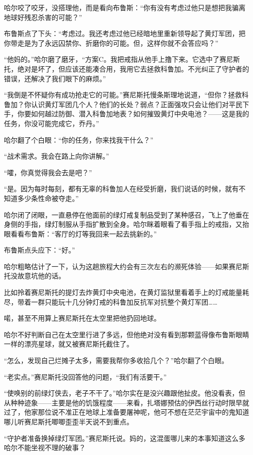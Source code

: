 \documentclass[../main]{subfiles}
\begin{document}
哈尔咬了咬牙，没搭理他，而是看向布鲁斯：“你有没有考虑过他只是想把我骗离地球好残忍杀害的可能？”

布鲁斯点了下头：“考虑过。我还考虑过他已经暗地里重新领导起了黄灯军团，把你带走是为了永远囚禁你、折磨你的可能。但，这样你就不会答应吗？”

“他妈的。”哈尔磨了磨牙，“方案C。我把戒指从他手上撸下来。它选中了赛尼斯托，绝对是坏了，但应该还能凑合用，我用它去拯救科鲁加。不光纠正了守护者的错误，还解决了我们眼下的麻烦。”

“我倒是不怀疑你有成功抢走它的可能。”赛尼斯托慢条斯理地说道，“但你？拯救科鲁加？你认识黄灯军团几个人？他们的长处？弱点？正面强攻只会让他们对平民下手，你要如何越过防御、潜入科鲁加地表？如何摧毁黄灯中央电池？——这是我的任务，你没可能完成它，乔丹。”

哈尔翻了个白眼：“你的任务，你来找我干什么？”

“战术需求。我会在路上向你讲解。”

“嚯，你真觉得我会去是吧？”

“是。因为每时每刻，都有无辜的科鲁加人在经受折磨，我们说话的时候，就有不知道多少条性命被夺走。”

哈尔闭了闭眼，一直悬停在他面前的绿灯戒复制品受到了某种感召，飞上了他垂在身侧的手指，绿灯制服从手指扩散到全身。哈尔眯着眼看了看手指上的戒指，又抬眼看看布鲁斯：“客厅的灯等我回来一起去挑新的。”

布鲁斯点头应下：“好。”

哈尔粗略估计了一下，认为这趟旅程大约会有三次左右的濒死体验——如果赛尼斯托没故意坑他的话。

比如拎着赛尼斯托的提灯去炸黄灯中央电池，在黄灯监狱里看着手上的灯戒能量耗尽，带着一群只能玩十几分钟灯戒的科鲁加反抗军对抗整个黄灯军团……

喏，甚至不用算上赛尼斯托在太空里把他扔回地球。

哈尔不好判断自己在太空里行进了多远，但他绝对没有看到那颗蓝得像布鲁斯眼睛一样的漂亮星球，就又被赛尼斯托截住了。

“怎么，发现自己烂摊子太多，需要我帮你多收拾几个？”哈尔翻了个白眼。

“老实点。”赛尼斯托没回答他的问题，“我们有活要干。”

“使唤别的前绿灯侠去，老子不干了。”哈尔实在是没兴趣跟他扯皮。他没看表，但从种种迹象——主要是他的饥饿程度——来看，扎塔娜预估的伊西丝行动时限早就过了，他家那位说不准正在地球上准备要屠神呢，他可不想在茫茫宇宙中的鬼知道哪儿听赛尼斯托唧唧歪歪半天说不到重点。

“守护者准备换掉绿灯军团。”赛尼斯托说。妈的，这混蛋哪儿来的本事知道这么多哈尔不能坐视不理的破事？
\end{document}
